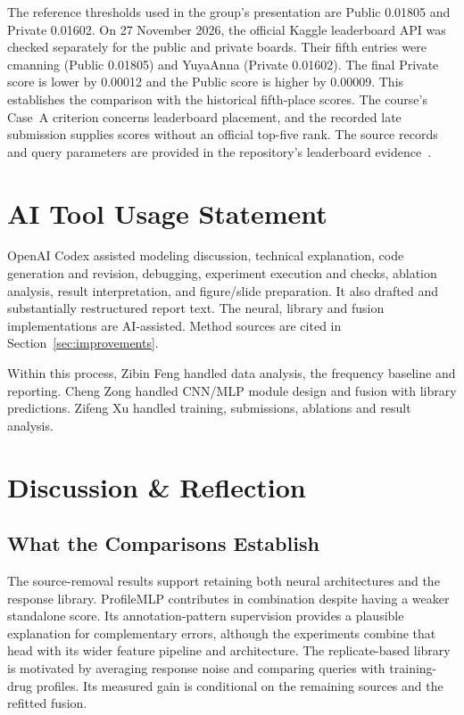 \documentclass[journal]{IEEEtran}
\begin{document}
The reference thresholds used in the group's presentation are Public 0.01805 and Private 0.01602. On 27 November 2026, the official Kaggle leaderboard API was checked separately for the public and private boards. Their fifth entries were cmanning (Public 0.01805) and YuyaAnna (Private 0.01602). The final Private score is lower by 0.00012 and the Public score is higher by 0.00009. This establishes the comparison with the historical fifth-place scores. The course's Case~A criterion concerns leaderboard placement, and the recorded late submission supplies scores without an official top-five rank. The source records and query parameters are provided in the repository's leaderboard evidence~\cite{ref_leaderboard}.

\section{AI Tool Usage Statement}
\label{sec:ai}

OpenAI Codex assisted modeling discussion, technical explanation, code generation and revision, debugging, experiment execution and checks, ablation analysis, result interpretation, and figure/slide preparation. It also drafted and substantially restructured report text. The neural, library and fusion implementations are AI-assisted. Method sources are cited in Section~\ref{sec:improvements}.

Within this process, Zibin Feng handled data analysis, the frequency baseline and reporting. Cheng Zong handled CNN/MLP module design and fusion with library predictions. Zifeng Xu handled training, submissions, ablations and result analysis.

\section{Discussion \& Reflection}
\label{sec:discussion}

\subsection{What the Comparisons Establish}
The source-removal results support retaining both neural architectures and the response library. ProfileMLP contributes in combination despite having a weaker standalone score. Its annotation-pattern supervision provides a plausible explanation for complementary errors, although the experiments combine that head with its wider feature pipeline and architecture. The replicate-based library is motivated by averaging response noise and comparing queries with training-drug profiles. Its measured gain is conditional on the remaining sources and the refitted fusion.
\end{document}
